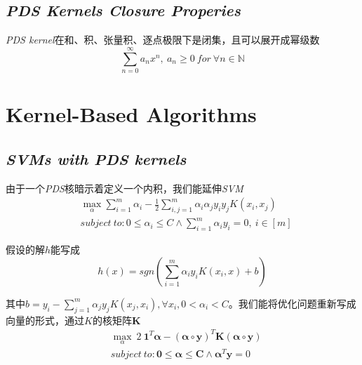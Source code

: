 \subsection*{\textsl{PDS Kernels Closure Properies}}

\begin{mdframed}
    \begin{theorem}
        \textsl{PDS kernel}在和、积、张量积、逐点极限下是闭集，且可以展开成幂级数
        \begin{equation}
            \sum^{\infty}_{n=0}a_nx^n,\ a_n\geqslant 0\ for\ \forall n\in \mathbb{N}
        \end{equation}
    \end{theorem}
\end{mdframed}

\section{Kernel-Based Algorithms}

\subsection*{\textsl{SVMs with PDS kernels}}

由于一个\textsl{PDS}核暗示着定义一个内积，我们能延伸\textsl{SVM}
\begin{equation}
    \begin{aligned}
        & \max_{\alpha}\sum_{i=1}^{m}\alpha_i-\frac{1}{2}\sum_{i,j=1}^{m}\alpha_i\alpha_j y_i y_j K(x_i,x_j) \\
        & subject\ to:0\leqslant \alpha_i\leqslant C \wedge \sum_{i=1}^{m}\alpha_iy_i=0,\ i\in [m]
    \end{aligned}
\end{equation}

假设的解$h$能写成
\begin{equation}
    h(x)=sgn\left(\sum_{i=1}^{m}\alpha_iy_iK(x_i,x)+b\right)
\end{equation}

其中$b=y_i-\sum_{j=1}^{m}\alpha_jy_jK(x_j,x_i),\forall x_i,0<\alpha_i<C$。我们能将优化问题重新写成向量的形式，通过$K$的核矩阵$\mathbf{K}$
\begin{equation}
    \begin{aligned}
        & \max_{\alpha}\ 2\ \mathbf{1}^T\mathbf{\alpha}-(\mathbf{\alpha}\circ \mathbf{y})^T\mathbf{K}(\mathbf{\alpha}\circ \mathbf{y})\\
        & subject\ to:\mathbf{0}\leqslant \mathbf{\alpha}\leqslant \mathbf{C}\wedge \mathbf{\alpha}^T\mathbf{y}=0
    \end{aligned}
\end{equation}

